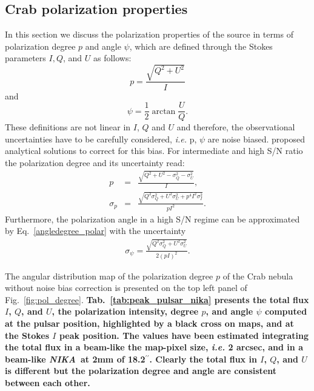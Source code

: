 \documentclass[twocolumn,traditabstract]{aa}
\def\NIKA{\textit{NIKA}}
\begin{document}
\subsection{Crab polarization properties}\label{sec:pol_properties}
In this section we discuss the polarization properties of the source in terms of polarization degree $p$ and angle $\psi$, which are defined through the Stokes parameters $I, Q$, and $U$ as follows:
\begin{equation}
 p    = \frac{\sqrt{Q^2 + U^2}}{I} \nonumber 
\end{equation}
and
 \begin{equation}
 \psi = \frac{1}{2}\arctan\frac{U}{Q}.\label{angledegree_polar}
 \end{equation}
These definitions are not linear in $I$, $Q$ and $U$ and therefore, the observational uncertainties have to be carefully considered, {\it i.e.} p, $\psi$ are noise biased. 
\citet{1980A&A....91...97S,1985A&A...142..100S,montier} proposed analytical solutions to correct for this bias. For intermediate and high S/N ratio the polarization degree and its uncertainty read:
 \begin{eqnarray}
 p    &=& \frac{\sqrt{Q^2 + U^2 - \sigma_{Q}^2 - \sigma_{U}^2}}{I}, \nonumber \\ 
  \sigma_{p} &=& \frac{\sqrt{Q^2\sigma_Q^2 + U^2\sigma_U^2 + p^4I^2\sigma_I^2}}{pI^2}.
  \label{p_true_degree}
 \end{eqnarray}
 Furthermore, the polarization angle in a high S/N regime can be approximated by Eq.~\ref{angledegree_polar} with the uncertainty
  \begin{eqnarray}\label{angle_uncertainty}
  \sigma_{\psi} = \frac{\sqrt{Q^2\sigma_Q^2 + U^2\sigma_U^2}}{2(pI)^2}.
  \end{eqnarray}

The angular distribution map of the polarization degree $p$ of the Crab nebula
without noise bias correction is presented on the top left panel of
Fig.~\ref{fig:pol_degree}.  \textbf{Tab.~\ref{tab:peak_pulsar_nika} presents the total
flux $I$, $Q$, and $U$, the polarization intensity, degree $p$, and angle $\psi$ computed at the pulsar
position, highlighted by a black cross on maps, and at the Stokes $I$ peak
position. The values have been estimated integrating the total flux in a beam-like the map-pixel size, {\it i.e.} 2 arcsec, and in a beam-like \NIKA\ at 2mm of 18.2$^{\prime\prime}$.
Clearly the total flux in $I$, $Q$, and $U$ is different but the polarization degree and angle are consistent between each other.}
\end{document}
